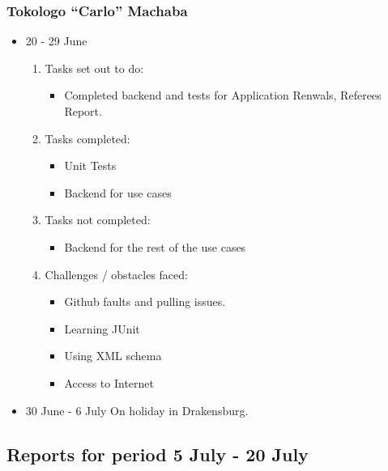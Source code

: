 \subsubsection{Tokologo “Carlo” Machaba}
\begin{itemize}
	\item 20 - 29 June
	\begin{enumerate}
	\item Tasks set out to do:
	\begin{itemize}
		\item Completed backend and tests for Application Renwals, Referees Report.
	\end{itemize}
	\item Tasks completed:
	\begin{itemize}
		\item Unit Tests
		\item Backend for use cases
	\end{itemize}
	\item Tasks not completed:
	\begin{itemize}
		\item Backend for the rest of the use cases
	\end{itemize}	
	\item Challenges / obstacles faced:
	\begin{itemize}
		\item Github faults and pulling issues.
		\item Learning JUnit 
		\item Using XML schema
		\item Access to Internet
	\end{itemize}
	\end{enumerate}
	\item 30 June - 6 July On holiday in Drakensburg.	 
\end{itemize}



\subsection{Reports for period 5 July - 20 July}
